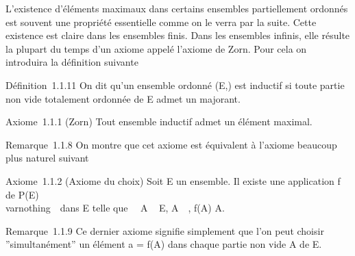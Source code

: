 L'existence d'éléments maximaux dans certains ensembles partiellement
ordonnés est souvent une propriété essentielle comme on le verra par la
suite. Cette existence est claire dans les ensembles finis. Dans les
ensembles infinis, elle résulte la plupart du temps d'un axiome appelé
l'axiome de Zorn. Pour cela on introduira la définition suivante

Définition~1.1.11 On dit qu'un ensemble ordonné (E,\leqslant) est inductif si
toute partie non vide totalement ordonnée de E admet un majorant.

Axiome~1.1.1 (Zorn) Tout ensemble inductif admet un élément maximal.

Remarque~1.1.8 On montre que cet axiome est équivalent à l'axiome
beaucoup plus naturel suivant

Axiome~1.1.2 (Axiome du choix) Soit E un ensemble. Il existe une
application f de P(E) \diagdown\\varnothing~\ dans E
telle que \forall~~A \subset~ E,
A\neq~\varnothing~, f(A) \in A.

Remarque~1.1.9 Ce dernier axiome signifie simplement que l'on peut
choisir ''simultanément'' un élément a = f(A) dans chaque partie non
vide A de E.

